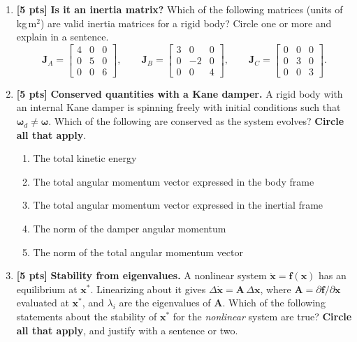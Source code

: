 \documentclass[11pt,letterpaper]{article}
\newcommand{\answerspace}[1]{\par\vspace{#1}}
\newcommand{\exampagebreak}{\newpage}
\newcommand{\pts}[1]{\textbf{[#1 pts]}}
\newcommand{\bw}{\boldsymbol{\omega}}
\begin{document}
\begin{enumerate}[label=\textbf{I.\arabic*}, leftmargin=*, itemsep=1em]
\item \pts{5} \textbf{Is it an inertia matrix?} Which of the following matrices (units of kg\,m$^2$) are valid inertia matrices for a rigid body? Circle one or more and explain in a sentence. 
\[
\mathbf{J}_A = \begin{bmatrix} 4 & 0 & 0 \\ 0 & 5 & 0 \\ 0 & 0 & 6 \end{bmatrix}, \qquad
\mathbf{J}_B = \begin{bmatrix} 3 & 0 & 0 \\ 0 & -2 & 0 \\ 0 & 0 & 4 \end{bmatrix}, \qquad
\mathbf{J}_C = \begin{bmatrix} 0 & 0 & 0 \\ 0 & 3 & 0 \\ 0 & 0 & 3 \end{bmatrix}.
\]
\answerspace{2.2in}

\item \pts{5} \textbf{Conserved quantities with a Kane damper.} A rigid body with an internal Kane damper is spinning freely with initial conditions such that $\bw_d \neq \bw$. Which of the following are conserved as the system evolves? \textbf{Circle all that apply}.

\smallskip
\begin{enumerate}[label=(\Alph*), nosep, leftmargin=2.2em]
    \item The total kinetic energy
    \item The total angular momentum vector expressed in the body frame
    \item The total angular momentum vector expressed in the inertial frame
    \item The norm of the damper angular momentum
    \item The norm of the total angular momentum vector
\end{enumerate}
\answerspace{1.8in}
\exampagebreak

\item \pts{5} \textbf{Stability from eigenvalues.} A nonlinear system $\dot{\mathbf{x}} = \mathbf{f}(\mathbf{x})$ has an equilibrium at $\mathbf{x}^*$. Linearizing about it gives $\Delta\dot{\mathbf{x}} = \mathbf{A}\,\Delta\mathbf{x}$, where $\mathbf{A} = \partial\mathbf{f}/\partial\mathbf{x}$ evaluated at $\mathbf{x}^*$, and $\lambda_i$ are the eigenvalues of $\mathbf{A}$. Which of the following statements about the stability of $\mathbf{x}^*$ for the \emph{nonlinear} system are true? \textbf{Circle all that apply}, and justify with a sentence or two.


\end{enumerate}
\end{document}
